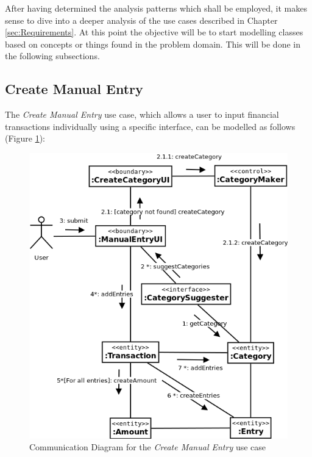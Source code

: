 After having determined the analysis patterns which shall be employed, it makes
sense to dive into a deeper analysis of the use cases described in Chapter
\ref{sec:Requirements}. At this point the objective will be to start modelling
classes based on concepts or things found in the problem domain. This will be
done in the following subsections.

\subsection{Create Manual Entry} \label{sec:AnalysisAndDesign.ManualEntry}

The \emph{Create Manual Entry} use case, which allows a
user to input financial transactions individually using a specific interface,
can be modelled as follows (Figure \ref{fig:CommDiagram.CreateManualEntry}):
\begin{figure}[ht!]
  \begin{center}
    \includegraphics[width=16cm]{./contents/img/Comm_Diagram_-_Manual_Entry.png}
  \end{center}
  \caption{Communication Diagram for the \emph{Create Manual Entry} use case}
  \label{fig:CommDiagram.CreateManualEntry}
\end{figure}
\FloatBarrier

